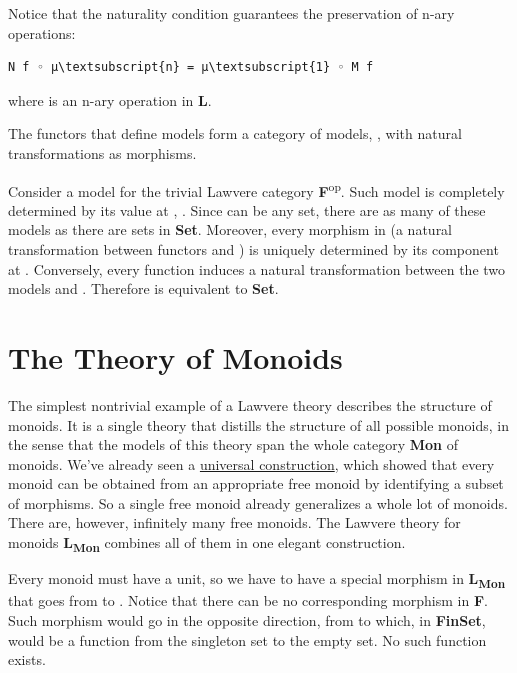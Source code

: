 Notice that the naturality condition guarantees the preservation of
n-ary operations:

\begin{Verbatim}[commandchars=\\\{\}]
N f ◦ μ\textsubscript{n} = μ\textsubscript{1} ◦ M f
\end{Verbatim}
where  is an n-ary operation in
\textbf{L}.

The functors that define models form a category of models,
, with natural transformations as morphisms.

Consider a model for the trivial Lawvere category
\textbf{F}\textsuperscript{op}. Such model is completely determined by
its value at , . Since  can be any
set, there are as many of these models as there are sets in
\textbf{Set}. Moreover, every morphism in  (a
natural transformation between functors  and ) is
uniquely determined by its component at . Conversely, every
function  induces a natural
transformation between the two models  and .
Therefore  is equivalent to \textbf{Set}.

\section{The Theory of Monoids}\label{the-theory-of-monoids}

The simplest nontrivial example of a Lawvere theory describes the
structure of monoids. It is a single theory that distills the structure
of all possible monoids, in the sense that the models of this theory
span the whole category \textbf{Mon} of monoids. We've already seen a
\hyperref[chap-free-monoids]{universal
construction}, which showed that every monoid can be obtained from an
appropriate free monoid by identifying a subset of morphisms. So a
single free monoid already generalizes a whole lot of monoids. There
are, however, infinitely many free monoids. The Lawvere theory for
monoids \textbf{L\textsubscript{Mon}} combines all of them in one
elegant construction.

Every monoid must have a unit, so we have to have a special morphism
 in \textbf{L\textsubscript{Mon}} that goes from  to
. Notice that there can be no corresponding morphism in
\textbf{F}. Such morphism would go in the opposite direction, from
 to  which, in \textbf{FinSet}, would be a function
from the singleton set to the empty set. No such function exists.

